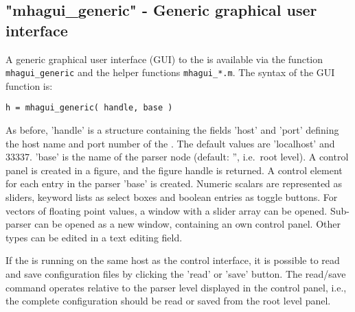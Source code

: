 \subsection{"mhagui\_generic" - Generic graphical user interface}
\label{sec:mhagui_generic}

A generic graphical user interface (GUI) to the \mhad{} is available
via the function \verb!mhagui_generic! and the helper functions
\verb!mhagui_*.m!.
%
The syntax of the GUI function is:
\begin{verbatim}
h = mhagui_generic( handle, base )
\end{verbatim}
%
As before, 'handle' is a structure containing the fields 'host' and
'port' defining the host name and port number of the \mhad{}. The
default values are 'localhost' and 33337.
%
'base' is the name of the \mha{} parser node (default: '', i.e.\ root level).
%
A control panel is created in a \Matlab{} figure, and the figure
handle is returned.
%
A control element for each entry in the parser 'base' is created.
%
Numeric scalars are represented as sliders, keyword lists as select
boxes and boolean entries as toggle buttons.
%
For vectors of floating point values, a window with a slider array can
be opened.
%
Sub-parser can be opened as a new window, containing an own control
panel.
%
Other types can be edited in a text editing field.

If the \mha{} is running on the same host as the \Matlab{} control
interface, it is possible to read and save \mha{} configuration files by
clicking the 'read' or 'save' button. The read/save command operates
relative to the \mha{} parser level displayed in the control panel, i.e.,
the complete configuration should be read or saved from the root level
panel.



